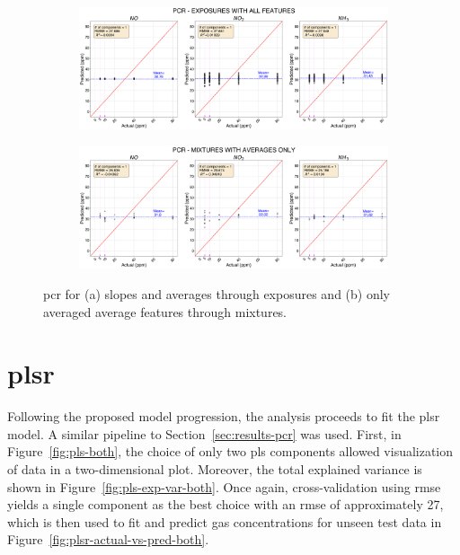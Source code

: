 \begin{figure}[!htb]
	\centering
	
	\begin{subfigure}[t]{1\textwidth}
		\includegraphics[width=1\linewidth]{../figures/pcr-act-vs-pred.png}
		\caption{}
		\label{fig:pcr-act-vs-pred} 
	\end{subfigure}
	
	\begin{subfigure}[t]{1\textwidth}
		\includegraphics[width=1\linewidth]{../figures/pcr-act-vs-pred-avg-feat.png}
		\caption{}
		\label{fig:pcr-act-vs-pred-avg-feat}
	\end{subfigure}
	
	\caption{\acrshort{pcr} for (a) slopes and averages through exposures and (b) only averaged average features through mixtures.}
	\label{fig:pcr-both}
\end{figure}

\clearpage
\section{\acrlong{plsr}}
\label{sec:results-plsr}

Following the proposed model progression, the analysis proceeds to fit the \acrshort{plsr} model. A similar pipeline to Section~\ref{sec:results-pcr} was used. First, in Figure~\ref{fig:pls-both}, the choice of only two \acrshort{pls} components allowed visualization of data in a two-dimensional plot. Moreover, the total explained variance is shown in Figure~\ref{fig:pls-exp-var-both}. Once again, cross-validation using \acrshort{rmse} yields a single component as the best choice with an \acrshort{rmse} of approximately 27, which is then used to fit and predict  gas concentrations for unseen test data in Figure~\ref{fig:plsr-actual-vs-pred-both}.

